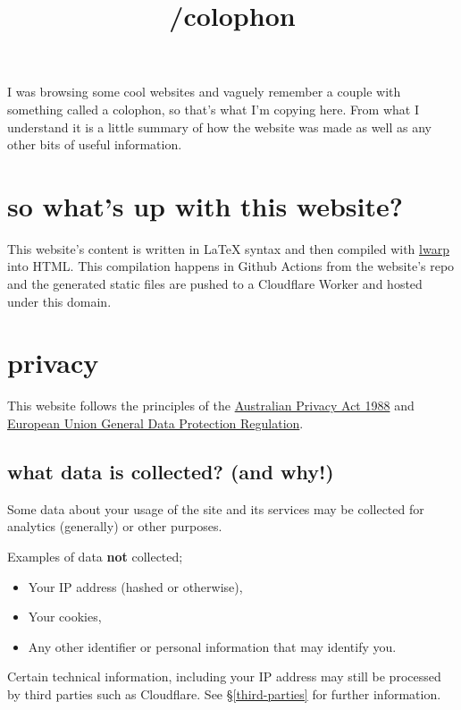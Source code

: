 \documentclass{article}
\title{/colophon}
\author{}
\date{}
\begin{document}

\maketitle
I was browsing some cool websites and vaguely remember a couple with something called a colophon, so that's what I'm copying here.
From what I understand it is a little summary of how the website was made as well as any other bits of useful information.

\section{so what's up with this website?}
This website's content is written in \LaTeX\; syntax and then compiled with \href{https://ctan.org/pkg/lwarp}{lwarp} into HTML.
This compilation happens in  Github Actions from the website's repo and 
the generated static files are pushed to a Cloudflare Worker and hosted under this domain.


\section{privacy}
This website follows the principles of the \href{https://www.legislation.gov.au/C2004A03712}{Australian Privacy Act 1988} 
and \href{https://data.europa.eu/eli/reg/2016/679}{European Union General Data Protection Regulation}.

\subsection{what data is collected? (and why!)}
Some data about your usage of the site and its services may be collected for analytics (generally) or other purposes.


Examples of data \textbf{not} collected;
\begin{itemize}
\item Your IP address (hashed or otherwise),
\item Your cookies,
\item Any other identifier or personal information that may identify you.
\end{itemize}

Certain technical information, including your IP address may still be processed by 
third parties such as Cloudflare. See \S\ref{third-parties} for further information.
\end{document}

